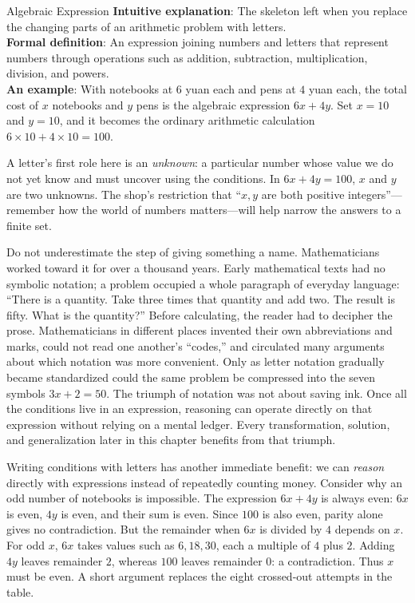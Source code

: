 \begin{shuyu}{Algebraic Expression}
\textbf{Intuitive explanation}: The skeleton left when you replace the changing parts of an arithmetic problem with letters.\\
\textbf{Formal definition}: An expression joining numbers and letters that represent numbers through operations such as addition, subtraction, multiplication, division, and powers.\\
\textbf{An example}: With notebooks at $6$ yuan each and pens at $4$ yuan each, the total cost of $x$ notebooks and $y$ pens is the algebraic expression $6x+4y$. Set $x=10$ and $y=10$, and it becomes the ordinary arithmetic calculation $6\times10+4\times10=100$.
\end{shuyu}

A letter's first role here is an \emph{unknown}: a particular number whose value we do not yet know and must uncover using the conditions. In $6x+4y=100$, $x$ and $y$ are two unknowns. The shop's restriction that ``$x,y$ are both positive integers''---remember how the world of numbers matters---will help narrow the answers to a finite set.

Do not underestimate the step of giving something a name. Mathematicians worked toward it for over a thousand years. Early mathematical texts had no symbolic notation; a problem occupied a whole paragraph of everyday language: ``There is a quantity. Take three times that quantity and add two. The result is fifty. What is the quantity?'' Before calculating, the reader had to decipher the prose. Mathematicians in different places invented their own abbreviations and marks, could not read one another's ``codes,'' and circulated many arguments about which notation was more convenient. Only as letter notation gradually became standardized could the same problem be compressed into the seven symbols $3x+2=50$. The triumph of notation was not about saving ink. Once all the conditions live in an expression, reasoning can operate directly on that expression without relying on a mental ledger. Every transformation, solution, and generalization later in this chapter benefits from that triumph.

Writing conditions with letters has another immediate benefit: we can \emph{reason} directly with expressions instead of repeatedly counting money. Consider why an odd number of notebooks is impossible. The expression $6x+4y$ is always even: $6x$ is even, $4y$ is even, and their sum is even. Since $100$ is also even, parity alone gives no contradiction. But the remainder when $6x$ is divided by $4$ depends on $x$. For odd $x$, $6x$ takes values such as $6,18,30$, each a multiple of $4$ plus $2$. Adding $4y$ leaves remainder $2$, whereas $100$ leaves remainder $0$: a contradiction. Thus $x$ must be even. A short argument replaces the eight crossed-out attempts in the table.


